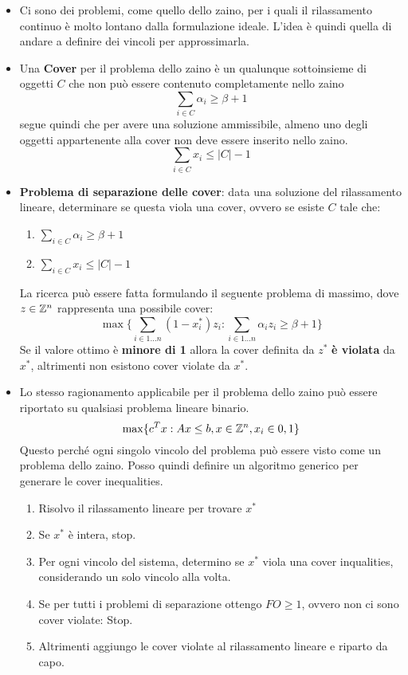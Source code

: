 \begin{itemize}
	\item Ci sono dei problemi, come quello dello zaino, per i quali il rilassamento continuo è molto lontano dalla formulazione ideale. L'idea è quindi quella di andare a definire dei vincoli per approssimarla.
	\item Una \textbf{Cover} per il problema dello zaino è un qualunque sottoinsieme di oggetti $C$ che non può essere contenuto completamente nello zaino
	$$
	\sum_{i \in C} \alpha_i \geq \beta +1
	$$
	segue quindi che per avere una soluzione ammissibile, almeno uno degli oggetti appartenente alla cover non deve essere inserito nello zaino.
	$$
	\sum_{i \in C} x_i \leq |C|-1
	$$
	\item \textbf{Problema di separazione delle cover}: data una soluzione del rilassamento lineare, determinare se questa viola una cover, ovvero se esiste $C$ tale che:
	\begin{enumerate}
		\item $\sum_{i \in C} \alpha_i \geq \beta +1$
		\item $ 	\sum_{i \in C} x_i \leq |C|-1$
	\end{enumerate}
	La ricerca può essere fatta formulando il seguente problema di massimo, dove $z \in \mathbb{Z}^n$ rappresenta una possibile cover:
	$$
	\max \{ \sum_{i \in 1\ldots n}(1 - x_{i}^*)z_i : \sum_{i \in 1 \ldots n} \alpha_i z_i \geq \beta +1 \}
	$$
	Se il valore ottimo è \textbf{minore di 1} allora la cover definita da $z^*$ \textbf{è violata} da $x^*$, altrimenti non esistono cover violate da $x^*$.
	\item Lo stesso ragionamento applicabile per il problema dello zaino può essere riportato su qualsiasi problema lineare binario.
	$$
	\max \{  c^Tx : Ax \leq b, x \in \mathbb{Z}^n, x_i \in {0,1} \}
	$$
	Questo perché ogni singolo vincolo del problema può essere visto come un problema dello zaino.
	Posso quindi definire un algoritmo generico per generare le cover inequalities.
	\begin{enumerate}
		\item Risolvo il rilassamento lineare per trovare $x^*$
		\item Se $x^*$ è intera, stop.
		\item Per ogni vincolo del sistema, determino se $x^*$ viola una cover inqualities, considerando un solo vincolo alla volta.
		\item Se per tutti i problemi di separazione ottengo $FO \geq 1$, ovvero non ci sono cover violate: Stop.
		\item Altrimenti aggiungo le cover violate al rilassamento lineare e riparto da capo.

\end{enumerate}
\end{itemize}
